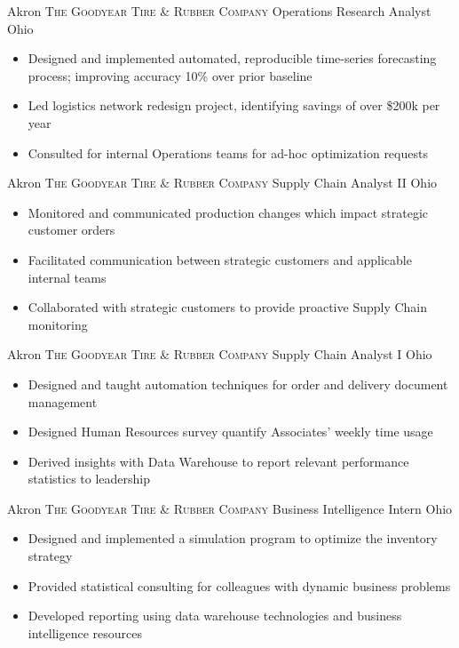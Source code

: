 \documentclass[letterpaper,12pt,color,final]{moderncv}
\begin{document}
{Akron}
{\textsc{The Goodyear Tire \& Rubber Company}}
{Operations Research Analyst}
{Ohio}
{\begin{itemize}
  \item Designed and implemented automated, reproducible time-series forecasting process; improving accuracy 10\% over prior baseline
  \item Led logistics network redesign project, identifying savings of over \$200k per year
  \item Consulted for internal Operations teams for ad-hoc optimization requests
 \end{itemize}}

{Akron}
{\textsc{The Goodyear Tire \& Rubber Company}}
{Supply Chain Analyst II}
{Ohio}
{\begin{itemize}
  \item Monitored and communicated production changes which impact strategic customer orders
  \item Facilitated communication between strategic customers and applicable internal teams
  \item Collaborated with strategic customers to provide proactive Supply Chain monitoring
 \end{itemize}}

\newpage

{Akron}
{\textsc{The Goodyear Tire \& Rubber Company}}
{Supply Chain Analyst I}
{Ohio}
{\begin{itemize}
  \item Designed and taught automation techniques for order and delivery document management
  \item Designed Human Resources survey quantify Associates' weekly time usage
  \item Derived insights with Data Warehouse to report relevant performance statistics to leadership
 \end{itemize}}

{Akron}
{\textsc{The Goodyear Tire \& Rubber Company}}
{Business Intelligence Intern}
{Ohio}
{\begin{itemize}
  \item Designed and implemented a simulation program to optimize the inventory strategy
  \item Provided statistical consulting for colleagues with dynamic business problems
  \item Developed reporting using data warehouse technologies and business intelligence resources
 \end{itemize}}
\end{document}
